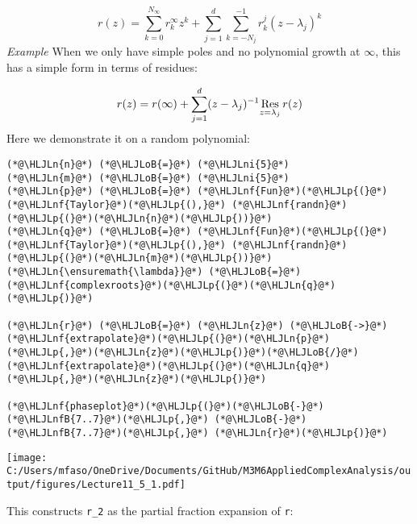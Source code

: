 \documentclass[12pt,a4paper]{article}
\newcommand{\HLJLn}[1]{#1}
\newcommand{\HLJLnf}[1]{\textcolor[RGB]{66,102,213}{#1}}
\newcommand{\HLJLnfB}[1]{\textcolor[RGB]{59,151,46}{#1}}
\newcommand{\HLJLni}[1]{\textcolor[RGB]{59,151,46}{#1}}
\newcommand{\HLJLoB}[1]{\textcolor[RGB]{102,102,102}{\textbf{#1}}}
\newcommand{\HLJLp}[1]{#1}
\begin{document}
\[
r(z) = \sum_{k=0}^{N_\infty} r_k^\infty z^k  +  \sum_{j=1}^d \sum_{k = -N_j}^{-1} r_k^j (z - \lambda_j)^k
\]
\emph{Example} When we only have simple poles and no polynomial growth at $\infty$, this has a simple form in terms of residues:

\[
r(z) = r(\infty)  +  \sum_{j=1}^d    (z - \lambda_j)^{-1} \underset{z = \lambda_j}{\rm Res}\, r(z)
\]
Here we demonstrate it on a random polynomial:


\begin{lstlisting}
(*@\HLJLn{n}@*) (*@\HLJLoB{=}@*) (*@\HLJLni{5}@*)
(*@\HLJLn{m}@*) (*@\HLJLoB{=}@*) (*@\HLJLni{5}@*)
(*@\HLJLn{p}@*) (*@\HLJLoB{=}@*) (*@\HLJLnf{Fun}@*)(*@\HLJLp{(}@*)(*@\HLJLnf{Taylor}@*)(*@\HLJLp{(),}@*) (*@\HLJLnf{randn}@*)(*@\HLJLp{(}@*)(*@\HLJLn{n}@*)(*@\HLJLp{))}@*)
(*@\HLJLn{q}@*) (*@\HLJLoB{=}@*) (*@\HLJLnf{Fun}@*)(*@\HLJLp{(}@*)(*@\HLJLnf{Taylor}@*)(*@\HLJLp{(),}@*) (*@\HLJLnf{randn}@*)(*@\HLJLp{(}@*)(*@\HLJLn{m}@*)(*@\HLJLp{))}@*)
(*@\HLJLn{\ensuremath{\lambda}}@*) (*@\HLJLoB{=}@*) (*@\HLJLnf{complexroots}@*)(*@\HLJLp{(}@*)(*@\HLJLn{q}@*)(*@\HLJLp{)}@*)

(*@\HLJLn{r}@*) (*@\HLJLoB{=}@*) (*@\HLJLn{z}@*) (*@\HLJLoB{->}@*) (*@\HLJLnf{extrapolate}@*)(*@\HLJLp{(}@*)(*@\HLJLn{p}@*)(*@\HLJLp{,}@*)(*@\HLJLn{z}@*)(*@\HLJLp{)}@*)(*@\HLJLoB{/}@*)(*@\HLJLnf{extrapolate}@*)(*@\HLJLp{(}@*)(*@\HLJLn{q}@*)(*@\HLJLp{,}@*)(*@\HLJLn{z}@*)(*@\HLJLp{)}@*)

(*@\HLJLnf{phaseplot}@*)(*@\HLJLp{(}@*)(*@\HLJLoB{-}@*)(*@\HLJLnfB{7..7}@*)(*@\HLJLp{,}@*) (*@\HLJLoB{-}@*)(*@\HLJLnfB{7..7}@*)(*@\HLJLp{,}@*) (*@\HLJLn{r}@*)(*@\HLJLp{)}@*)
\end{lstlisting}

\texttt{[image: C:/Users/mfaso/OneDrive/Documents/GitHub/M3M6AppliedComplexAnalysis/output/figures/Lecture11\_5\_1.pdf]}

This constructs \texttt{r\_2} as the partial fraction expansion of \texttt{r}:
\end{document}
